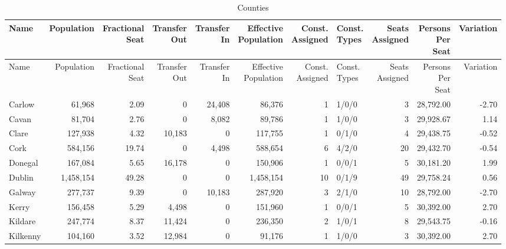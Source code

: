 \documentclass[a4paper]{article}
\begin{document}
\begin{longtable}{lrrrrrrlrrr}
\caption{Counties}
\\ \toprule
Name &Population &\shortstack{Fractional\\Seat} &\shortstack{Transfer\\Out} &\shortstack{Transfer\\In} &\shortstack{Effective\\Population} &\shortstack{Const.\\Assigned} &\shortstack{Const.\\Types} &\shortstack{Seats\\Assigned} &\shortstack{Persons\\Per\\Seat} &Variation \\ \midrule
\endfirsthead
\toprule
Name &Population &\shortstack{Fractional\\Seat} &\shortstack{Transfer\\Out} &\shortstack{Transfer\\In} &\shortstack{Effective\\Population} &\shortstack{Const.\\Assigned} &\shortstack{Const.\\Types} &\shortstack{Seats\\Assigned} &\shortstack{Persons\\Per\\Seat} &Variation \\ \midrule
\endhead
\bottomrule
\endfoot
Carlow&61,968& 2.09&0&24,408&86,376&1&1/0/0&3&28,792.00&-2.70\\ 
Cavan&81,704& 2.76&0&8,082&89,786&1&1/0/0&3&29,928.67& 1.14\\ 
Clare&127,938& 4.32&10,183&0&117,755&1&0/1/0&4&29,438.75&-0.52\\ 
Cork&584,156&19.74&0&4,498&588,654&6&4/2/0&20&29,432.70&-0.54\\ 
Donegal&167,084& 5.65&16,178&0&150,906&1&0/0/1&5&30,181.20& 1.99\\ 
Dublin&1,458,154&49.28&0&0&1,458,154&10&0/1/9&49&29,758.24& 0.56\\ 
Galway&277,737& 9.39&0&10,183&287,920&3&2/1/0&10&28,792.00&-2.70\\ 
Kerry&156,458& 5.29&4,498&0&151,960&1&0/0/1&5&30,392.00& 2.70\\ 
Kildare&247,774& 8.37&11,424&0&236,350&2&1/0/1&8&29,543.75&-0.16\\ 
Kilkenny&104,160& 3.52&12,984&0&91,176&1&1/0/0&3&30,392.00& 2.70\\ 

\end{longtable}
\end{document}
